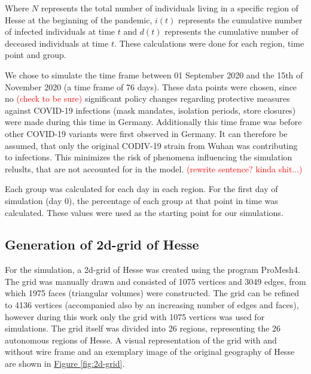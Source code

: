 \par
Where $N$ represents the total number of individuals living in a specific region of Hesse at the beginning of the pandemic, $i(t)$
represents the cumulative number of infected individuals at time $t$ and $d(t)$ represents the cumulative number of deceased
individuals at time $t$. These calculations were done for each region, time point and group.\newline

\par
We chose to simulate the time frame between 01 September 2020 and the 15{th} of November 2020 (a time frame of 76 days). These
data points were chosen, since no
\textcolor{red}{(check to be sure)} %
significant policy changes regarding protective measures against COVID-19 infections (mask mandates, isolation periods, store closures) 
were made during this time in Germany. Additionally this time frame was before other COVID-19 variants were first observed in
Germany\cite{??}. It can therefore be assumed, that only the original CODIV-19 strain from Wuhan was contributing to infections.
This minimizes the risk of phenomena influencing the simulation reluslts, that are not accounted for in the model.
\textcolor{red}{(rewrite sentence? kinda shit...)}\newline

\par
Each group was calculated for each day in each region. For the first day of simulation (day 0), the percentage of each group at that
point in time was calculated. These values were used as the starting point for our simulations.


\subsection{Generation of 2d-grid of Hesse}
For the simulation, a 2d-grid of Hesse was created using the program ProMesh4. The grid was manually drawn and consisted
of 1075 vertices and 3049 edges, from which 1975 faces (triangular volumes) were constructed. The grid can be refined
to 4136 vertices (accompanied also by an increasing number of edges and faces), however during this work only the grid
with 1075 vertices was used for simulations. The grid itself was divided into 26 regions, representing the 26 autonomous
regions of Hesse. A visual representation of the grid with and without wire frame and an exemplary image of the original geography
of Hesse are shown in \hyperref[fig:2d-grid]{Figure \ref*{fig:2d-grid}}.

